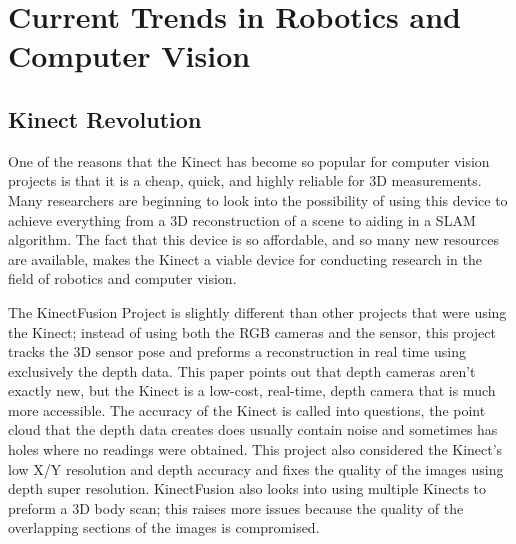 \documentclass[pdftex,10.5pt]{report}
\begin{document}
\section{Current Trends in Robotics and Computer Vision}

\subsection{Kinect Revolution}
One of the reasons that the Kinect has become so popular for computer vision projects is that it is a cheap, quick, and highly reliable for 3D measurements. Many researchers are beginning to look into the possibility of using this device to achieve everything from a 3D reconstruction of a scene to aiding in a SLAM algorithm. The fact that this device is so affordable, and so many new resources are available, makes the Kinect a viable device for conducting research in the field of robotics and computer vision.

The KinectFusion Project is slightly different than other projects that were using the Kinect; instead of using both the RGB cameras and the sensor, this project tracks the 3D sensor pose and preforms a reconstruction in real time using exclusively the depth data. This paper points out that depth cameras aren't exactly new, but the Kinect is a low-cost, real-time, depth camera that is much more accessible. The accuracy of the Kinect is called into questions, the point cloud that the depth data creates does usually contain noise and sometimes has holes where no readings were obtained. This project also considered the Kinect's low X/Y resolution and depth accuracy and fixes the quality of the images using depth super resolution. KinectFusion also looks into using multiple Kinects to preform a 3D body scan; this raises more issues because the quality of the overlapping sections of the images is compromised.
\end{document}
